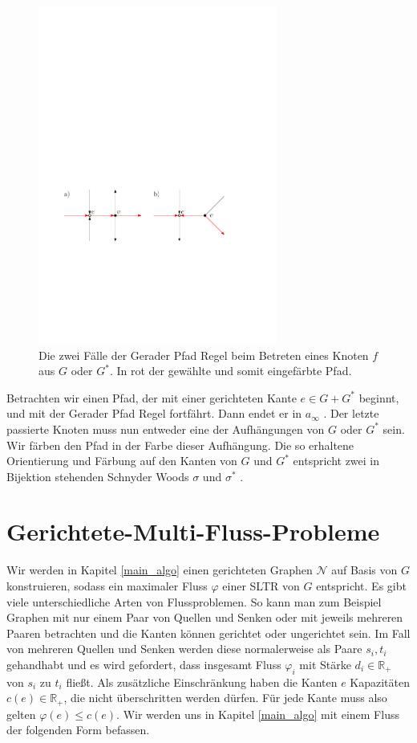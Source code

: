 \begin{figure}
	\centering
	\includegraphics[width=0.7\textwidth]{straight_path.pdf}
  \caption{Die zwei Fälle der Gerader Pfad Regel beim Betreten eines Knoten $f$ aus $G$ oder $G^*$. In rot der gewählte und somit eingefärbte Pfad.}
  \label{straight_path}
\end{figure}

Betrachten wir einen Pfad, der mit einer gerichteten Kante $e \in G+G^*$ beginnt, und mit der Gerader Pfad Regel fortfährt. Dann endet er in $a_\infty$ \cite[Lemma 15]{felsner01}. Der letzte passierte Knoten muss nun entweder eine der Aufhängungen von $G$ oder $G^*$ sein. Wir färben den Pfad in der Farbe dieser Aufhängung. Die so erhaltene Orientierung und Färbung auf den Kanten von $G$ und $G^*$ entspricht zwei in Bijektion stehenden Schnyder Woods $\sigma$ und $\sigma^*$ \cite{felsner04}.

\section{Gerichtete-Multi-Fluss-Probleme}\label{dir_multi_flow}

Wir werden in Kapitel \ref{main_algo} einen gerichteten Graphen $\mathcal{N}$ auf Basis von $G$ konstruieren, sodass ein maximaler Fluss $\varphi$ einer SLTR von $G$ entspricht. Es gibt viele unterschiedliche Arten von Flussproblemen. So kann man zum Beispiel Graphen mit nur einem Paar von Quellen und Senken oder mit jeweils mehreren Paaren betrachten und die Kanten können gerichtet oder ungerichtet sein. Im Fall von mehreren Quellen und Senken werden diese normalerweise als Paare $s_i,t_i$ gehandhabt und es wird gefordert, dass insgesamt Fluss $\varphi_i$ mit Stärke $d_i \in \mathbb{R}_+$ von $s_i$ zu $t_i$ fließt. Als zusätzliche Einschränkung haben die Kanten $e$ Kapazitäten $c(e) \in \mathbb{R}_+$, die nicht überschritten werden dürfen. Für jede Kante muss also gelten $\varphi(e) \leq c(e)$. Wir werden uns in Kapitel \ref{main_algo} mit einem Fluss der folgenden Form befassen.

